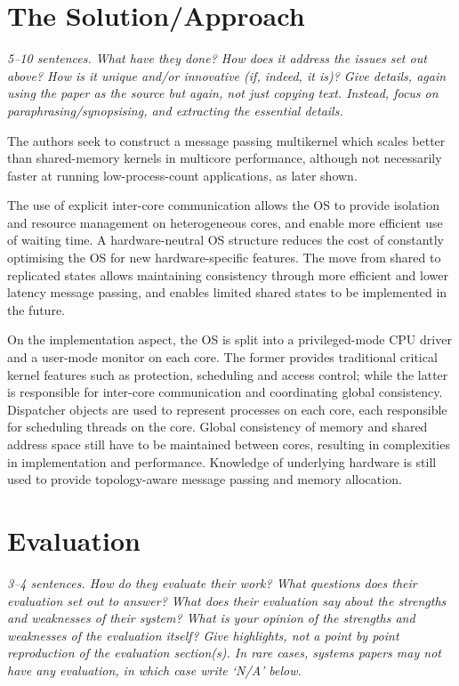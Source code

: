 \documentclass[11pt]{article}
\begin{document}
\section*{The Solution/Approach}
\textsl{5--10 sentences. What have they done? How does it address the issues set out above? How is it unique and/or innovative (if, indeed, it is)? Give details, again using the paper as the source but again, not just copying text. Instead, focus on paraphrasing/synopsising, and extracting the essential details.}

The authors seek to construct a message passing multikernel which scales better than shared-memory kernels in multicore performance, although not necessarily faster at running low-process-count applications, as later shown. 

The use of explicit inter-core communication allows the OS to provide isolation and resource management on heterogeneous cores, and enable more efficient use of waiting time. A hardware-neutral OS structure reduces the cost of constantly optimising the OS for new hardware-specific features. The move from shared to replicated states allows maintaining consistency through more efficient and lower latency message passing, and enables limited shared states to be implemented in the future.

On the implementation aspect, the OS is split into a privileged-mode CPU driver and a user-mode monitor on each core. The former provides traditional critical kernel features such as protection, scheduling and access control; while the latter is responsible for inter-core communication and coordinating global consistency. Dispatcher objects are used to represent processes on each core, each responsible for scheduling threads on the core. Global consistency of memory and shared address space still have to be maintained between cores, resulting in complexities in implementation and performance. Knowledge of underlying hardware is still used to provide topology-aware message passing and memory allocation.


\section*{Evaluation}
\textsl{3--4 sentences. How do they evaluate their work? What questions does their evaluation set out to answer? What does their evaluation say about the strengths and weaknesses of their system? What is your opinion of the strengths and weaknesses of the evaluation itself?  Give highlights, not a point by point reproduction of the evaluation section(s). In rare cases, systems papers may not have any evaluation, in which case write `N/A' below.}
\end{document}
